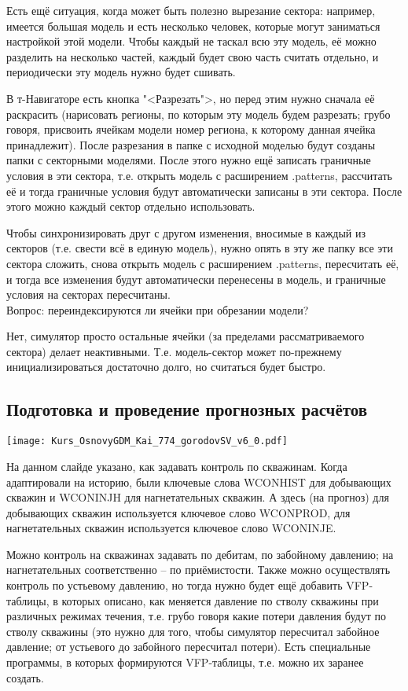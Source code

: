 \documentclass[main.tex]{subfiles}
\begin{document}
Есть ещё ситуация, когда может быть полезно вырезание сектора: например, имеется большая модель и есть несколько человек, которые могут заниматься настройкой этой модели.
Чтобы каждый не таскал всю эту модель, её можно разделить на несколько частей, каждый будет свою часть считать отдельно, и периодически эту модель нужно будет сшивать.

В т-Навигаторе есть кнопка "<Разрезать">, но перед этим нужно сначала её раскрасить (нарисовать регионы, по которым эту модель будем разрезать; грубо говоря, присвоить ячейкам модели номер региона, к которому данная ячейка принадлежит).
После разрезания в папке с исходной моделью будут созданы папки с секторными моделями.
После этого нужно ещё записать граничные условия в эти сектора, т.е. открыть модель с расширением .patterns, рассчитать её и тогда граничные условия будут автоматически записаны в эти сектора.
После этого можно каждый сектор отдельно использовать.

Чтобы синхронизировать друг с другом изменения, вносимые в каждый из секторов (т.е. свести всё в единую модель), нужно опять в эту же папку все эти сектора сложить, снова открыть модель с расширением .patterns, пересчитать её, и тогда все изменения будут автоматически перенесены в модель, и граничные условия на секторах пересчитаны.
\\

Вопрос: переиндексируются ли ячейки при обрезании модели?

Нет, симулятор просто остальные ячейки (за пределами рассматриваемого сектора) делает неактивными.
Т.е. модель-сектор может по-прежнему инициализироваться достаточно долго, но считаться будет быстро.

\subsection{Подготовка и проведение прогнозных расчётов}

\texttt{[image: Kurs\_OsnovyGDM\_Kai\_774\_gorodovSV\_v6\_0.pdf]}

На данном слайде указано, как задавать контроль по скважинам.
Когда адаптировали на историю, были ключевые слова WCONHIST для добывающих скважин и WCONINJH для нагнетательных скважин.
А здесь (на прогноз) для добывающих скважин используется ключевое слово WCONPROD, для нагнетательных скважин используется ключевое слово WCONINJE.

Можно контроль на скважинах задавать по дебитам, по забойному давлению; на нагнетательных соответственно -- по приёмистости.
Также можно осуществлять контроль по устьевому давлению, но тогда нужно будет ещё добавить VFP-таблицы, в которых описано, как меняется давление по стволу скважины при различных режимах течения, т.е. грубо говоря какие потери давления будут по стволу скважины (это нужно для того, чтобы симулятор пересчитал забойное давление; от устьевого до забойного пересчитал потери).
Есть специальные программы, в которых формируются VFP-таблицы, т.е. можно их заранее создать.
\\
\end{document}

